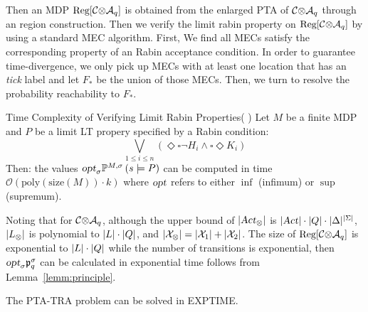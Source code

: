 Then an MDP $\mbox{Reg}[ {{\mathcal{C}}{\otimes}{\mathcal{A}_q}} ]$ is obtained from the enlarged 
PTA of $ {\mathcal{C}}{\otimes}{\mathcal{A}_q} $ through an region construction.
Then we verify the limit rabin property on $\mbox{Reg}[ {{\mathcal{C}}{\otimes}{\mathcal{A}_q}} ]$
by using a standard MEC algorithm. First, We find all MECs satisfy the corresponding
property of an Rabin acceptance condition. In order to guarantee time-divergence,
we only pick up MECs with at least one location that has an \textit{tick} label and 
let $F_*$ be the union of those MECs. Then, we turn to resolve the probability
reachability to $F_*$.
%
\begin{lemma}{Time Complexity of Verifying Limit Rabin Properties(
    \cite[Theorem 10.127]{DBLP:books/daglib/0020348}
)}\label{lemm:principle}
Let $M$ be a finite MDP and $P$ be a limit LT propery specified by a Rabin condition:
$$
\bigvee_{1 \le i \le n} \left(
    \Diamond \square \lnot H_i 
    \land 
    \square \Diamond K_i 
\right)
$$
Then: the values 
$
\mbox{\sl opt}_\sigma \mathbb{P}^{M,\sigma} \left(
    s \models P 
\right)
$ 
can be computed in time 
$
\mathcal{O} \left( 
    \mbox{poly} \left(
        \mbox{size} \left(
            M
        \right)
    \right)
    \cdot
    k
\right)
$
where $\mbox{\sl opt}$ refers to either $\inf$ (infimum) or $\sup$ (supremum).
\end{lemma}

Noting that for  ${\mathcal{C}}{\otimes}{\mathcal{A}_q}$, 
although the upper bound of $| \mbox{\sl Act}_\otimes |$ is 
$ | \mbox{\sl Act} | \cdot | Q| \cdot | \Delta |^{ | \Sigma | }$, 
$ | L_\otimes | $ is polynomial to $ |L| \cdot |Q| $, and 
$ | \mathcal{X}_\otimes | = | \mathcal{X}_1 | + | \mathcal{X}_2| $.
The size of $ \mbox{Reg}[ {{\mathcal{C}}{\otimes}{\mathcal{A}_q}} ] $ is exponential to 
$ |L| \cdot |Q| $ while the number of transitions is exponential, 
then $\mbox{\sl opt}_\sigma\mathfrak{p}_{q}^{\sigma}$ can be calculated in exponential time 
follows from Lemma~\ref{lemm:principle}.

\begin{proposition}
    The PTA-TRA problem can be solved in EXPTIME.
\end{proposition}
%
%

